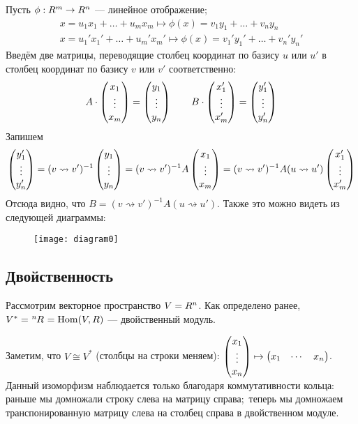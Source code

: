 \documentclass[a4paper]{report}
\begin{document}
    Пусть $\phi: R^{m} \rightarrow R^{n}$ --- линейное отображение;
    \begin{gather*}
        x=u_{1}x_{1}+\dots +u_{m}x_{m} \mapsto \phi(x)=v_{1}y_{1}+\dots+v_{n}y_{n}\\
        x=u_{1}'x_{1}'+\dots+u_{m}'x_{m}' \mapsto \phi(x)=v_{1}'y_{1}'+\dots+v_{n}'y_{n}'
    \end{gather*}
    Введём две матрицы, переводящие столбец координат по базису $u$ или $u'$ в столбец координат по базису $v$ или $v'$ соответственно:
    \begin{gather*}
        A \cdot \begin{pmatrix}x_1 \\ \vdots \\ x_m\end{pmatrix} = \begin{pmatrix}y_1 \\ \vdots \\ y_n\end{pmatrix}\qquad
        B \cdot \begin{pmatrix}x_1' \\ \vdots \\ x_m'\end{pmatrix} = \begin{pmatrix}y_1' \\ \vdots \\ y_n'\end{pmatrix}
    \end{gather*}
    Запишем \[\begin{pmatrix}y_{1}'\\ \vdots \\ y_{n}'\end{pmatrix} = (v\rightsquigarrow v')^{-1} \begin{pmatrix}y_{1}\\\vdots\\y_{n}\end{pmatrix}=(v\rightsquigarrow v')^{-1}A\begin{pmatrix}x_{1}\\\vdots\\x_{m}\end{pmatrix}=(v\rightsquigarrow v')^{-1}A(u\rightsquigarrow u')\begin{pmatrix}x_{1}'\\ \vdots \\x_{m}'\end{pmatrix}\]
    Отсюда видно, что $B=(v\rightsquigarrow v')^{-1}A(u \rightsquigarrow u')$.
    Также это можно видеть из следующей диаграммы:
    \begin{figure}[h!]
        \begin{center}
            \texttt{[image: diagram0]}
        \end{center}
    \end{figure}

    \subsection{Двойственность}
    Рассмотрим векторное пространство $V=\ind{}R{^n}$.
    Как определено ранее, $V^{*} = \ind{^n}R{} = \Hom(V,R)$ --- двойственный модуль.

    Заметим, что $V \cong V^{*}$ (столбцы на строки меняем): $\begin{pmatrix}x_{1}\\\vdots\\x_{n}\end{pmatrix} \mapsto \begin{pmatrix}x_{1} & \cdots & x_{n}\end{pmatrix}$.
    Данный изоморфизм наблюдается только благодаря коммутативности кольца: раньше мы домножали строку слева на матрицу справа;\ теперь мы домножаем транспонированную матрицу слева на столбец справа в двойственном модуле.
\end{document}
